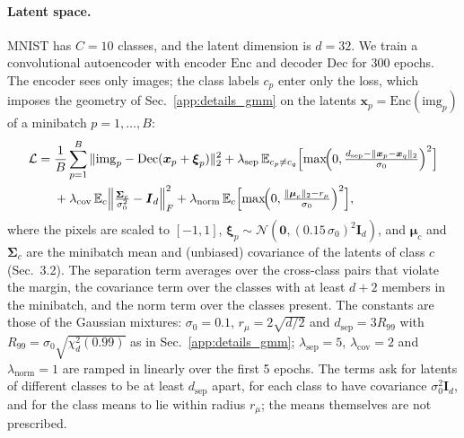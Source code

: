 \paragraph{Latent space.}
MNIST has $C = 10$ classes, and the latent dimension is $d = 32$. We train a convolutional
autoencoder with encoder $\mathrm{Enc}$ and decoder $\mathrm{Dec}$ for 300 epochs. The encoder sees
only images; the class labels $c_p$ enter only the loss, which imposes the geometry of
Sec.~\ref{app:details_gmm} on the latents $\boldsymbol{x}_p = \mathrm{Enc}(\mathrm{img}_p)$ of a
minibatch $p = 1, \dots, B$:
\begin{equation}
\begin{aligned}
    \mathcal{L} = \; & \frac{1}{B}\sum_{p=1}^{B} \|\mathrm{img}_p - \mathrm{Dec}(\boldsymbol{x}_p + \boldsymbol{\xi}_p)\|_2^2
    + \lambda_{\text{sep}}\, \mathbb{E}_{c_p \ne c_q} \Bigl[\max\!\Bigl(0, \tfrac{d_{\text{sep}} - \|\boldsymbol{x}_p - \boldsymbol{x}_q\|_2}{\sigma_0}\Bigr)^{2}\Bigr] \\
    & + \lambda_{\text{cov}}\, \mathbb{E}_{c} \Bigl\| \tfrac{\boldsymbol{\Sigma}_c}{\sigma_0^2} - \boldsymbol{I}_d \Bigr\|_F^2
    + \lambda_{\text{norm}}\, \mathbb{E}_{c} \Bigl[\max\!\Bigl(0, \tfrac{\|\boldsymbol{\mu}_c\|_2 - r_\mu}{\sigma_0}\Bigr)^{2}\Bigr],
\end{aligned}
\end{equation}
where the pixels are scaled to $[-1, 1]$,
$\boldsymbol{\xi}_p \sim \mathcal{N}(\boldsymbol{0}, (0.15\,\sigma_0)^2 \boldsymbol{I}_d)$, and
$\boldsymbol{\mu}_c$ and $\boldsymbol{\Sigma}_c$ are the minibatch mean and (unbiased) covariance of
the latents of class $c$ (Sec.~3.2). The separation term averages over the cross-class pairs that
violate the margin, the covariance term over the classes with at least $d + 2$ members in the
minibatch, and the norm term over the classes present. The constants are those of the Gaussian
mixtures: $\sigma_0 = 0.1$, $r_\mu = 2\sqrt{d/2}$ and $d_{\text{sep}} = 3R_{99}$ with
$R_{99} = \sigma_0\sqrt{\chi^2_d(0.99)}$ as in Sec.~\ref{app:details_gmm}; $\lambda_{\text{sep}} = 5$,
$\lambda_{\text{cov}} = 2$ and $\lambda_{\text{norm}} = 1$ are ramped in linearly over the first 5
epochs. The terms ask for latents of different classes to be at least $d_{\text{sep}}$ apart, for
each class to have covariance $\sigma_0^2\boldsymbol{I}_d$, and for the class means to lie within
radius $r_\mu$; the means themselves are not prescribed.

